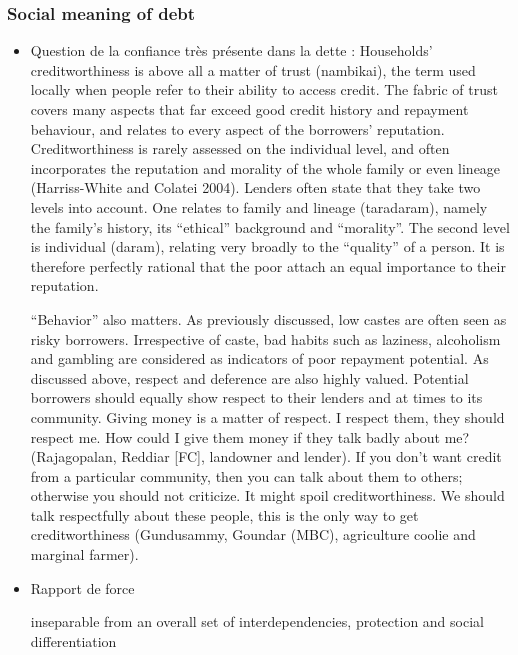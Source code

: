 \documentclass[a4paper, 11pt, onecolumn]{article}
\begin{document}


	\subsubsection{Social meaning of debt}
\begin{itemize}
\item Question de la confiance très présente dans la dette :
\cite{Guerin2014a} Households’ creditworthiness is above all a matter of trust (nambikai), the term used locally
when people refer to their ability to access credit. The fabric of trust covers many aspects that
far exceed good credit history and repayment behaviour, and relates to every aspect of the
borrowers’ reputation. Creditworthiness is rarely assessed on the individual level, and often
incorporates the reputation and morality of the whole family or even lineage (Harriss-White
and Colatei 2004). Lenders often state that they take two levels into account. One relates to
family and lineage (taradaram), namely the family’s history, its “ethical” background and
“morality”. The second level is individual (daram), relating very broadly to the “quality” of a
person. It is therefore perfectly rational that the poor attach an equal importance to their
reputation.

“Behavior” also matters. As previously discussed, low castes are often seen as risky
borrowers. Irrespective of caste, bad habits such as laziness, alcoholism and gambling are
considered as indicators of poor repayment potential. As discussed above, respect and deference are also highly valued. Potential borrowers should equally show respect to their
lenders and at times to its community.
Giving money is a matter of respect. I respect them, they should respect me. How could I give them
money if they talk badly about me? (Rajagopalan, Reddiar [FC], landowner and lender).
If you don’t want credit from a particular community, then you can talk about them to others; otherwise
you should not criticize. It might spoil creditworthiness. We should talk respectfully about these people,
this is the only way to get creditworthiness (Gundusammy, Goundar (MBC), agriculture coolie and
marginal farmer).

\item Rapport de force
\cite{Guerin2014}

\citep{Guerin2020a}
inseparable from an overall set of interdependencies, protection and social differentiation


\end{itemize}
\end{document}
